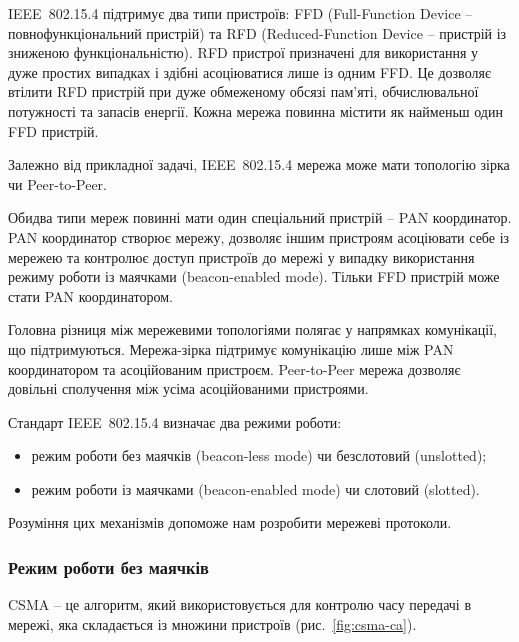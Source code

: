 \documentclass[a4paper,ukrainian,utf8,nocolumnsxix,floatsection]{eskdtext}
\renewcommand\paragraph{\subsubsection}
\newcommand{\figref}[1]{рис.~\ref{#1}}
\newcommand{\iee}[0]{IEEE~802.15.4\xspace}
\begin{document}
\iee підтримує два типи пристроїв: FFD (Full-Function Device – повнофункціональний пристрій) та RFD (Reduced-Function Device – пристрій із зниженою функціональністю). RFD пристрої призначені для використання у дуже простих випадках і здібні асоціюватися лише із одним FFD. Це дозволяє втілити RFD пристрій при дуже обмеженому обсязі пам’яті, обчислювальної потужності та запасів енергії. Кожна мережа повинна містити як найменьш один FFD пристрій. 

Залежно від прикладної задачі, \iee мережа може мати топологію зірка чи Peer-to-Peer. 

Обидва типи мереж повинні мати один спеціальний пристрій – PAN координатор. PAN координатор створює мережу, дозволяє іншим пристроям асоціювати себе із мережею та контролює доступ пристроїв до мережі у випадку використання режиму роботи із маячками (beacon-enabled mode). Тільки FFD пристрій може стати PAN координатором.

Головна різниця між мережевими топологіями полягає у напрямках комунікації, що підтримуються. Мережа-зірка підтримує комунікацію лише між PAN координатором та асоційованим пристроєм. Peer-to-Peer мережа дозволяє довільні сполучення між усіма асоційованими пристроями.

Стандарт \iee визначає два режими роботи:
\begin{itemize}
	\item режим роботи без маячків (beacon-less mode) чи безслотовий (unslotted);
	\item режим роботи із маячками (beacon-enabled mode) чи слотовий (slotted).
\end{itemize}

Розуміння цих механізмів допоможе нам розробити мережеві протоколи.


\paragraph{Режим роботи без маячків}

CSMA – це алгоритм, який використовується для контролю часу передачі в мережі, яка складається із множини пристроїв (\figref{fig:csma-ca}).
\end{document}
